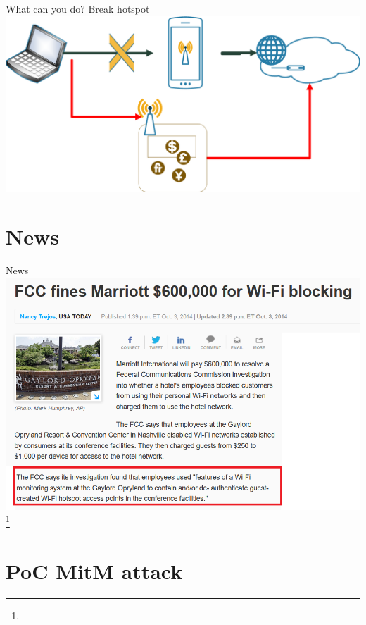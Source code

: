 \documentclass[10pt]{beamer}
\begin{document}
\begin{frame}{What can you do? Break hotspot}
\centering
\includegraphics[width=\textwidth]{hotel.png}
\end{frame}

\section{News}

\begin{frame}{News}
\centering
\includegraphics[width=\textwidth]{hotelfcc.png}\footnote{}
\end{frame}

\section{PoC MitM attack}
\end{document}
